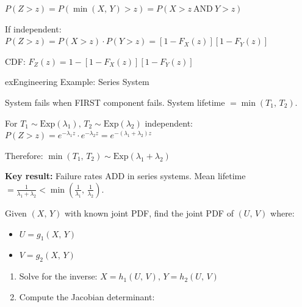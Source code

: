 

$P(Z > z) = P(\min (X,\,Y) > z) = P(X > z\ \text{AND}\ Y > z)$

If independent: $P(Z > z) = P(X > z) \cdot P(Y > z) = [1-F_{X}(z)][1-F_{Y}(z)]$

CDF: $F_{Z}(z) = 1 - [1-F_{X}(z)][1-F_{Y}(z)]$

\begin{PSbox}[unbreakable]{ex}{Engineering Example: Series System}

System fails when FIRST component fails. System lifetime $= \min (T_{1},\, T_{2})$.

For $T_{1} \sim \mathrm{Exp}(\lambda_{1}),\, T_{2} \sim \mathrm{Exp}(\lambda_{2})$ independent:\PSbr{}$P(Z > z) = e^{-\lambda_{1}z} \cdot e^{-\lambda_{2}z} = e^{-(\lambda_{1}+\lambda_{2})z}$

Therefore: $\min (T_{1},\, T_{2}) \sim \mathrm{Exp}(\lambda_{1} + \lambda_{2})$

\textbf{Key result:} Failure rates ADD in series systems. Mean lifetime $= \frac{1}{\lambda_{1}+\lambda_{2}} < \min \left(\frac{1}{\lambda_{1}},\, \frac{1}{\lambda_{2}}\right)$.

\end{PSbox}



Given $(X,\, Y)$ with known joint PDF, find the joint PDF of $(U,\, V)$ where:

\begin{itemize}
\tightlist
\item
  $U = g_{1}(X,\, Y)$
\item
  $V = g_{2}(X,\, Y)$
\end{itemize}


\begin{enumerate}
\def\labelenumi{\arabic{enumi}.}
\tightlist
\item
  Solve for the inverse: $X = h_{1}(U,\, V),\, Y = h_{2}(U,\, V)$
\item
  Compute the Jacobian determinant:
\end{enumerate}


